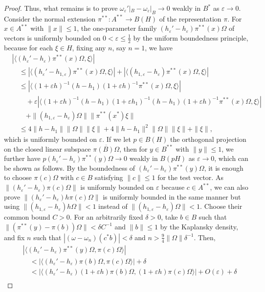 \documentclass[a4paper]{amsart}
\newcommand{\e}{\varepsilon}
\theoremstyle{plain}
\theoremstyle{definition}
\begin{document}
\begin{proof}
Thus, what remains is to prove $\omega_\e'|_B-\omega_\e|_B\to0$ weakly in $B^*$ as $\e\to0$.
Consider the normal extension $\pi^{**}:A^{**}\to B(H)$ of the representation $\pi$.
For $x\in A^{**}$ with $\|x\|\le1$, the one-parameter family $(h_\e'-h_\e)\pi^{**}(x)\Omega$ of vectors is uniformly bounded on $0<\e\le\frac12$ by the uniform boundedness principle, because for each $\xi\in H$, fixing any $n$, say $n=1$, we have
\begin{align*}
&|\langle(h_\e'-h_\e)\pi^{**}(x)\Omega,\xi\rangle|\\
&\quad\le|\langle(h_\e'-h_{1,\e})\pi^{**}(x)\Omega,\xi\rangle|+|\langle(h_{1,\e}-h_\e)\pi^{**}(x)\Omega,\xi\rangle|\\
&\quad\le|\langle(1+\e h)^{-1}(h-h_1)(1+\e h)^{-1}\pi^{**}(x)\Omega,\xi\rangle|\\
&\qquad+\e|\langle(1+\e h)^{-1}(h-h_1)(1+\e h_1)^{-1}(h-h_1)(1+\e h)^{-1}\pi^{**}(x)\Omega,\xi\rangle|\\
&\qquad+\|(h_{1,\e}-h_\e)\Omega\|\|\pi^{**}(x^*)\xi\|\\
&\quad\le4\|h-h_1\|\|\Omega\|\|\xi\|+4\|h-h_1\|^2\|\Omega\|\|\xi\|+\|\xi\|,
\end{align*}
which is uniformly bounded on $\e$.
If we let $p\in B(H)$ the orthogonal projection on the closed linear subspace $\overline{\pi(B)\Omega}$, then for $y\in B^{**}$ with $\|y\|\le1$, we further have $p(h_\e'-h_\e)\pi^{**}(y)\Omega\to0$ weakly in $B(pH)$ as $\e\to0$, which can be shown as follows.
By the boundedness of $(h_\e'-h_\e)\pi^{**}(y)\Omega$, it is enough to choose $\pi(c)\Omega$ with $c\in B$ satisfying $\|c\|\le1$ for the test vector. 
As $\|(h_\e'-h_\e)\pi(c)\Omega\|$ is uniformly bounded on $\e$ because $c\in A^{**}$, we can also prove $\|(h_\e'-h_\e)h\pi(c)\Omega\|$ is uniformly bounded in the same manner but using $\|(h_{1,\e}-h_\e)h\Omega\|<1$ instead of $\|(h_{1,\e}-h_\e)\Omega\|<1$. 
Choose their common bound $C>0$.
For an arbitrarily fixed $\delta>0$, take $b\in B$ such that $\|(\pi^{**}(y)-\pi(b))\Omega\|<\delta C^{-1}$ and $\|b\|\le1$ by the Kaplansky density, and fix $n$ such that $|(\omega-\omega_n)(c^*b)|<\delta$ and $n>\frac94\|\Omega\|\delta^{-1}$.
Then,
\begin{align*}
&|\langle(h_\e'-h_\e)\pi^{**}(y)\Omega,\pi(c)\Omega\rangle|\\
&\quad<|\langle(h_\e'-h_\e)\pi(b)\Omega,\pi(c)\Omega\rangle|+\delta\\
&\quad<|\langle(h_\e'-h_\e)(1+\e h)\pi(b)\Omega,(1+\e h)\pi(c)\Omega\rangle|+O(\e)+\delta\\

\end{align*}
\end{proof}
\end{document}

